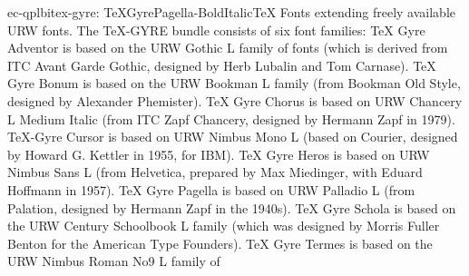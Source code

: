 \documentclass{ddltxtyp}
\begin{document}
\begin{package}{ec-qplbi}{tex-gyre: TeXGyrePagella-BoldItalic}{{\TeX} Fonts extending freely available URW fonts.}
The {\TeX}-GYRE bundle consists of six font families: {\TeX} Gyre
Adventor is based on the URW Gothic L family of fonts (which is
derived from ITC Avant Garde Gothic, designed by Herb Lubalin
and Tom Carnase). {\TeX} Gyre Bonum is based on the URW Bookman L
family (from Bookman Old Style, designed by Alexander
Phemister). {\TeX} Gyre Chorus is based on URW Chancery L Medium
Italic (from ITC Zapf Chancery, designed by Hermann Zapf in
1979). {\TeX}-Gyre Cursor is based on URW Nimbus Mono L (based on
Courier, designed by Howard G. Kettler in 1955, for IBM). {\TeX}
Gyre Heros is based on URW Nimbus Sans L (from Helvetica,
prepared by Max Miedinger, with Eduard Hoffmann in 1957). {\TeX}
Gyre Pagella is based on URW Palladio L (from Palation,
designed by Hermann Zapf in the 1940s). {\TeX} Gyre Schola is
based on the URW Century Schoolbook L family (which was
designed by Morris Fuller Benton for the American Type
Founders). {\TeX} Gyre Termes is based on the URW Nimbus Roman No9
L family of %
\end{package}
\end{document}

